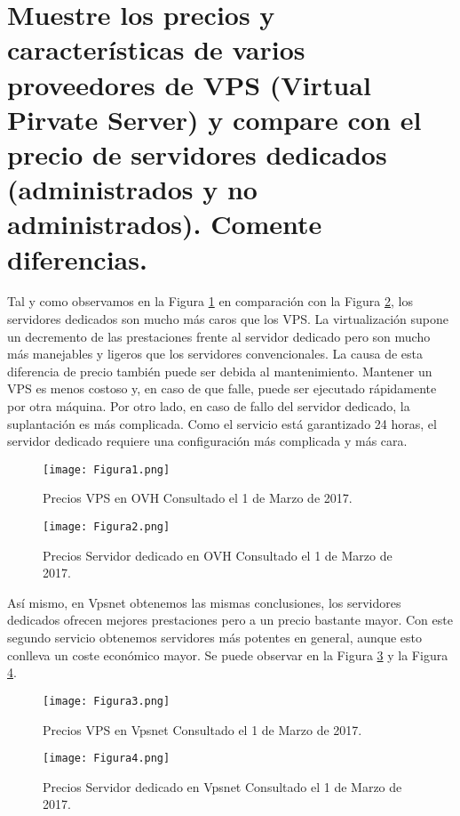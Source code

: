 \section{Muestre los precios y características de varios proveedores de VPS (Virtual Pirvate Server) y compare con el precio
de servidores dedicados (administrados y no administrados). Comente diferencias.}


Tal y como observamos en la Figura \ref{fig:figura1} en comparación con la Figura \ref{fig:figura2}, los servidores dedicados son mucho más
caros que los VPS. La virtualización supone un decremento de las prestaciones frente al servidor dedicado pero son mucho más manejables y ligeros que los servidores 
convencionales. La causa de esta diferencia de precio también puede ser debida al mantenimiento. Mantener un VPS es menos costoso y, en caso de que falle, puede ser ejecutado
rápidamente por otra máquina. Por otro lado, en caso de fallo del servidor dedicado, la suplantación es más complicada. Como el servicio está garantizado 24 horas, el servidor
dedicado requiere una configuración más complicada y más cara.

\begin{figure}[H] 
\centering
\texttt{[image: Figura1.png]}  
\caption{Precios VPS en OVH \cite{figura1} Consultado el 1 de Marzo de 2017.} \label{fig:figura1}
\end{figure}
\begin{figure}[H] 
\centering
\texttt{[image: Figura2.png]} 
\caption{Precios Servidor dedicado en OVH \cite{figura2} Consultado el 1 de Marzo de 2017.} \label{fig:figura2}
\end{figure}

Así mismo, en Vpsnet obtenemos las mismas conclusiones, los servidores dedicados ofrecen mejores prestaciones pero a un precio bastante mayor. Con este segundo servicio 
obtenemos servidores más potentes en general, aunque esto conlleva un coste económico mayor. Se puede observar en la Figura \ref{fig:figura3} y la Figura \ref{fig:figura4}.

\begin{figure}
\centering
\texttt{[image: Figura3.png]}
\caption{Precios VPS en Vpsnet \cite{figura3} Consultado el 1 de Marzo de 2017.} \label{fig:figura3}
\end{figure}
\begin{figure}
\centering
\texttt{[image: Figura4.png]} 
\caption{Precios Servidor dedicado en Vpsnet \cite{figura4} Consultado el 1 de Marzo de 2017.} \label{fig:figura4}
\end{figure}




